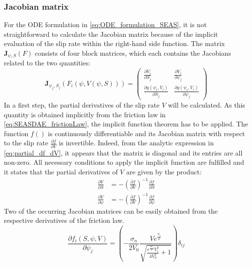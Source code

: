 \subsubsection{Jacobian matrix}
\label{sssec:Jacobian_ODE}
For the ODE formulation in \autoref{eq:ODE_formulation_SEAS}, it is not straightforward to calculate the Jacobian matrix because of the implicit evaluation of the slip rate within the right-hand side function. The matrix $\mathbf{J}_{\psi,S}(F)$ consists of four block matrices, which each contains the Jacobians related to the two quantities:
\begin{equation}
\label{eq:Jacobian_ODE_formulation}
\mathbf{J}_{\psi_j,S_j}\left(F_i\left(\psi,V(\psi,S)\right)\right) = \begin{pmatrix} 
\frac{\partial V_i}{\partial S_j} &
\frac{\partial V_i}{\partial \psi_j} \\ 
\frac{\partial g(\psi_i,V_i)}{\partial S_j} &
\frac{\partial g(\psi_i,V_i)}{\partial \psi_j}  \end{pmatrix}
\end{equation}
In a first step, the partial derivatives of the slip rate $V$ will be calculated. As this quantity is obtained implicitly from the friction law in \autoref{eq:SEASDAE_frictionLaw}, the implicit function theorem has to be applied. The function $f()$ is continuously differentiable and its Jacobian matrix with respect to the slip rate $\frac{\partial f}{\partial V}$ is invertible. Indeed, from the analytic expression in \autoref{eq:partial_df_dV}, it appears that the matrix is diagonal and its entries are all non-zero. All necessary conditions to apply the implicit function are fulfilled and it states that the partial derivatives of $V$ are given by the product:
\begin{align}
\label{eq:partial_V_S}
\frac{\partial V}{\partial S} &= -\left(\frac{\partial f}{\partial V}\right)^{-1}\frac{\partial f}{\partial S} \\ 
\label{eq:partial_V_psi}
\frac{\partial V}{\partial \psi} &= -\left(\frac{\partial f}{\partial V}\right)^{-1}\frac{\partial f}{\partial \psi} 
\end{align}
Two of the occurring Jacobian matrices can be easily obtained from the respective derivatives of the friction law. 
\begin{equation}
\frac{\partial f_i(S,\psi,V)}{\partial \psi_j} = \left( -\frac{\sigma_n}{2V_0} \frac{Ve^{\frac{\psi_i}{a}}}{\sqrt{\frac{e^{\frac{2\psi_i}{a}}V_i^2}{4V_0^2}+1}}\right)\delta_{ij} 
\label{eq:partial_df_dpsi}
\end{equation}	
